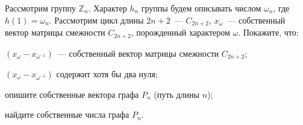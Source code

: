 Рассмотрим группу $\mathbb{Z}_n$. Характер $h_n$ группы будем описывать числом $\omega_n$, где
$h(1) = \omega_n$. Рассмотрим цикл длины $2n + 2$~--- $C_{2n + 2}$, $x_{\omega}$~--- собственный вектор
матрицы смежности $C_{2n + 2}$, порожденный характером $\omega$. Покажите, что:
\begin{enumcyr}
    \item $(x_{\omega} - x_{\omega^{-1}})$~--- собственный вектор матрицы смежности $C_{2n + 2}$;
    \item $(x_{\omega} - x_{\omega^{-1}})$ содержит хотя бы два нуля;
    \item опишите собственные вектора графа $P_n$ (путь длины $n$);
    \item найдите собственные числа графа $P_n$.
\end{enumcyr}
